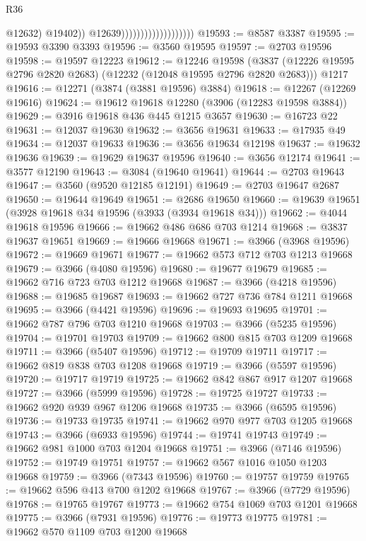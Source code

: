 \begin{lexlean}{R36}
\begin{coremodule}
                                                @12632)
                                              @19402))
                                          @12639)))))))))))))))))))
@19593 := @8587 @3387
@19595 := @19593 @3390 @3393
@19596 := @3560 @19595
@19597 := @2703 @19596
@19598 := @19597 @12223
@19612 := @12246
    @19598
    (@3837 (@12226 @19595 @2796 @2820 @2683) (@12232 (@12048 @19595 @2796 @2820 @2683)))
    @1217
@19616 := @12271 (@3874 (@3881 @19596) @3884)
@19618 := @12267 (@12269 @19616)
@19624 := @19612 @19618 @12280 (@3906 (@12283 @19598 @3884))
@19629 := @3916 @19618 @436 @445 @1215 @3657
@19630 := @16723 @22
@19631 := @12037 @19630
@19632 := @3656 @19631
@19633 := @17935 @49
@19634 := @12037 @19633
@19636 := @3656 @19634 @12198
@19637 := @19632 @19636
@19639 := @19629 @19637 @19596
@19640 := @3656 @12174
@19641 := @3577 @12190
@19643 := @3084 (@19640 @19641)
@19644 := @2703 @19643
@19647 := @3560 (@9520 @12185 @12191)
@19649 := @2703 @19647 @2687
@19650 := @19644 @19649
@19651 := @2686 @19650
@19660 := @19639 @19651 (@3928 @19618 @34 @19596 (@3933 (@3934 @19618 @34)))
@19662 := @4044 @19618 @19596
@19666 := @19662 @486 @686 @703 @1214
@19668 := @3837 @19637 @19651
@19669 := @19666 @19668
@19671 := @3966 (@3968 @19596)
@19672 := @19669 @19671
@19677 := @19662 @573 @712 @703 @1213 @19668
@19679 := @3966 (@4080 @19596)
@19680 := @19677 @19679
@19685 := @19662 @716 @723 @703 @1212 @19668
@19687 := @3966 (@4218 @19596)
@19688 := @19685 @19687
@19693 := @19662 @727 @736 @784 @1211 @19668
@19695 := @3966 (@4421 @19596)
@19696 := @19693 @19695
@19701 := @19662 @787 @796 @703 @1210 @19668
@19703 := @3966 (@5235 @19596)
@19704 := @19701 @19703
@19709 := @19662 @800 @815 @703 @1209 @19668
@19711 := @3966 (@5407 @19596)
@19712 := @19709 @19711
@19717 := @19662 @819 @838 @703 @1208 @19668
@19719 := @3966 (@5597 @19596)
@19720 := @19717 @19719
@19725 := @19662 @842 @867 @917 @1207 @19668
@19727 := @3966 (@5999 @19596)
@19728 := @19725 @19727
@19733 := @19662 @920 @939 @967 @1206 @19668
@19735 := @3966 (@6595 @19596)
@19736 := @19733 @19735
@19741 := @19662 @970 @977 @703 @1205 @19668
@19743 := @3966 (@6933 @19596)
@19744 := @19741 @19743
@19749 := @19662 @981 @1000 @703 @1204 @19668
@19751 := @3966 (@7146 @19596)
@19752 := @19749 @19751
@19757 := @19662 @567 @1016 @1050 @1203 @19668
@19759 := @3966 (@7343 @19596)
@19760 := @19757 @19759
@19765 := @19662 @596 @413 @700 @1202 @19668
@19767 := @3966 (@7729 @19596)
@19768 := @19765 @19767
@19773 := @19662 @754 @1069 @703 @1201 @19668
@19775 := @3966 (@7931 @19596)
@19776 := @19773 @19775
@19781 := @19662 @570 @1109 @703 @1200 @19668

\end{coremodule}
\end{lexlean}

